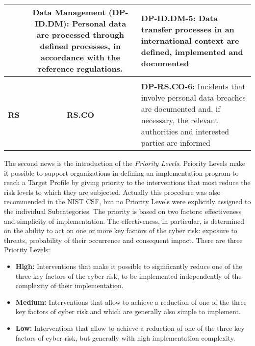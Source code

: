 \begin{table}[H]
\begin{tabularx}{\textwidth}{|c|c|X|}
\cline{3-3} & \multirow{-15}{0.2\textwidth}{{\cellcolor{dummy-yellow}}{\textbf{Data Management (DP-ID.DM):} Personal data are processed through defined processes, in accordance with the reference regulations.}} & {\cellcolor{dummy-yellow}}{\textbf{DP-ID.DM-5:} Data transfer processes in an international context are defined, implemented and documented}\\
\hline
\begin{tabular}[c]{@{}c@{}}{\textbf{RESPOND}}\\{\textbf{RS}}\end{tabular} & \textbf{RS.CO} & {\cellcolor{dummy-yellow}}{\textbf{DP-RS.CO-6:} Incidents that involve personal data breaches are documented and, if necessary, the relevant authorities and interested parties are informed}\\
\hline


\end{tabularx}
\end{table}\noindent
The second news is the introduction of the \textit{Priority Levels}.
Priority Levels make it possible to support organizations in defining an implementation program to reach a Target Profile by giving priority to the interventions that most reduce the risk levels to which they are subjected. Actually this procedure was also recommended in the NIST CSF, but no Priority Levels were explicitly assigned to the individual Subcategories. The priority is based on two factors: effectiveness and simplicity of implementation. The effectiveness, in particular, is determined on the ability to act on one or more key factors of the cyber risk: exposure to threats, probability of their occurrence and consequent impact. There are three Priority Levels:
\begin{itemize}
    \item \textbf{High:} Interventions that make it possible to significantly reduce one of the three key factors of the cyber risk, to be implemented independently of the complexity of their implementation.
    \item \textbf{Medium:} Interventions that allow to achieve a reduction of one of the three key factors of cyber risk and which are generally also simple to implement.
    \item \textbf{Low:} Interventions that allow to achieve a reduction of one of the three key factors of cyber risk, but generally with high implementation complexity.
\end{itemize}
